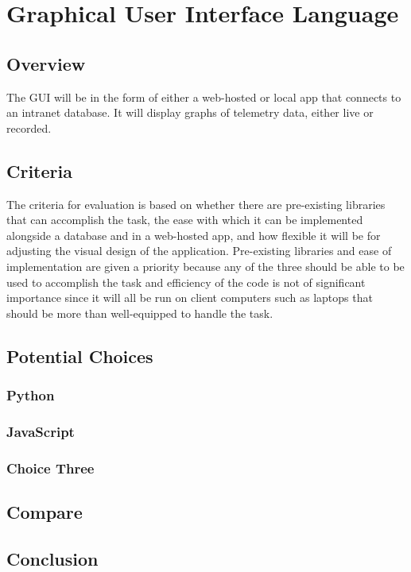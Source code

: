 \documentclass[onecolumn, draftclsnofoot,10pt, compsoc]{IEEEtran}
\begin{document}
\section{Graphical User Interface Language}
\subsection{Overview}
The GUI will be in the form of either a web-hosted or local app that connects to an intranet database. It will display graphs of telemetry data, either live or recorded. 
\subsection{Criteria}
The criteria for evaluation is based on whether there are pre-existing libraries that can accomplish the task, the ease with which it can be implemented alongside a database and in a web-hosted app, and how flexible it will be for adjusting the visual design of the application. Pre-existing libraries and ease of implementation are given a priority because any of the three should be able to be used to accomplish the task and efficiency of the code is not of significant importance since it will all be run on client computers such as laptops that should be more than well-equipped to handle the task.
\subsection{Potential Choices}
\subsubsection{Python}

\subsubsection{JavaScript}

\subsubsection{Choice Three}

\subsection{Compare}
\subsection{Conclusion}
\end{document}
